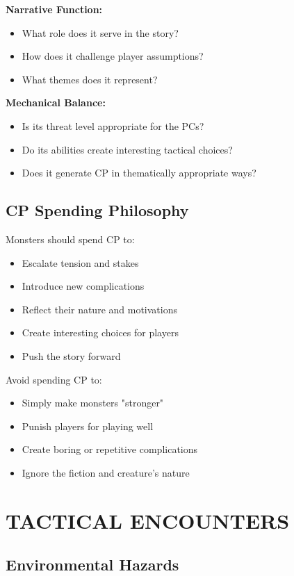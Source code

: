 \documentclass[12pt]{article}
\begin{document}
\begin{itemize}
\textbf{Narrative Function:}
\begin{itemize}
\item What role does it serve in the story?
\item How does it challenge player assumptions?
\item What themes does it represent?
\end{itemize}

\textbf{Mechanical Balance:}
\begin{itemize}
\item Is its threat level appropriate for the PCs?
\item Do its abilities create interesting tactical choices?
\item Does it generate CP in thematically appropriate ways?
\end{itemize}

\subsection*{CP Spending Philosophy}

Monsters should spend CP to:
\begin{itemize}
\item Escalate tension and stakes
\item Introduce new complications
\item Reflect their nature and motivations
\item Create interesting choices for players
\item Push the story forward
\end{itemize}

Avoid spending CP to:
\begin{itemize}
\item Simply make monsters "stronger"
\item Punish players for playing well
\item Create boring or repetitive complications
\item Ignore the fiction and creature's nature
\end{itemize}

\section{TACTICAL ENCOUNTERS}

\subsection*{Environmental Hazards}


\end{itemize}
\end{document}
